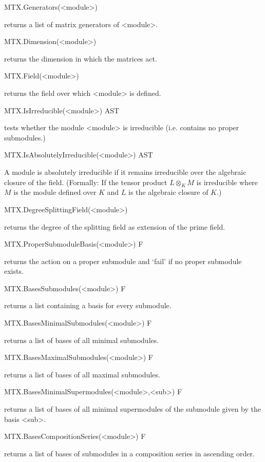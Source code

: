 \>MTX.Generators(<module>)

returns a list of matrix generators of <module>.

\>MTX.Dimension(<module>)

returns the dimension in which the matrices act.

\>MTX.Field(<module>)

returns the field over which <module> is defined.


\>MTX.IsIrreducible(<module>) AST

tests whether the module <module> is irreducible (i.e. contains no proper
submodules.)

\>MTX.IsAbsolutelyIrreducible(<module>) AST

A module is absolutely irreducible if it remains irreducible over the
algebraic closure of the field. (Formally: If the tensor product $L\otimes_K
M$ is irreducible where $M$ is the module defined over $K$ and $L$ is the
algebraic closure of $K$.)

\>MTX.DegreeSplittingField(<module>)

returns the degree of the splitting field as extension of the prime field.


\>MTX.ProperSubmoduleBasis(<module>) F

returns the action on a proper submodule and `fail' if no proper submodule
exists.

\>MTX.BasesSubmodules(<module>) F

returns a list containing a basis for every submodule.

\>MTX.BasesMinimalSubmodules(<module>) F

returns a list of bases of all minimal submodules.

\>MTX.BasesMaximalSubmodules(<module>) F

returns a list of bases of all maximal submodules.

\>MTX.BasesMinimalSupermodules(<module>,<sub>) F

returns a list of bases of all minimal supermodules of the submodule given by
the basis <sub>.

\>MTX.BasesCompositionSeries(<module>) F

returns a list of bases of submodules in a composition series in ascending
order.

